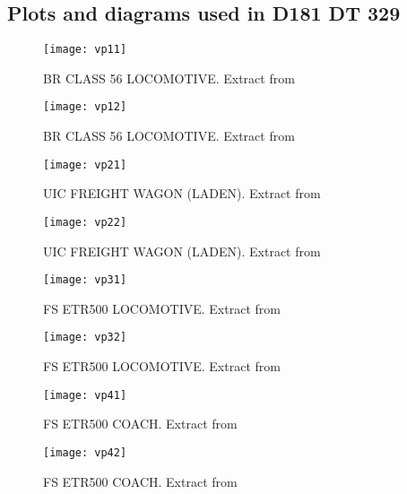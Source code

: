 \begin{appendices}


\chapter{Plots and diagrams used in D181 DT 329}\label{app:dt329data}

\begin{figure}[h]
    \centering
    \texttt{[image: vp11]}
    \caption{BR CLASS 56 LOCOMOTIVE. Extract from \citet[Appendix 2]{d181dt329}}
\end{figure}

\begin{figure}[h]
    \centering
    \texttt{[image: vp12]}
    \caption{BR CLASS 56 LOCOMOTIVE. Extract from \citet[Appendix 2]{d181dt329}}
\end{figure}

\begin{figure}[h]
    \centering
    \texttt{[image: vp21]}
    \caption{UIC FREIGHT WAGON (LADEN). Extract from \citet[Appendix 2]{d181dt329}}
\end{figure}

\begin{figure}[h]
    \centering
    \texttt{[image: vp22]}
    \caption{UIC FREIGHT WAGON (LADEN). Extract from \citet[Appendix 2]{d181dt329}}
\end{figure}

\begin{figure}[h]
    \centering
    \texttt{[image: vp31]}
    \caption{FS ETR500 LOCOMOTIVE. Extract from \citet[Appendix 2]{d181dt329}}
\end{figure}

\begin{figure}[h]
    \centering
    \texttt{[image: vp32]}
    \caption{FS ETR500 LOCOMOTIVE. Extract from \citet[Appendix 2]{d181dt329}}
\end{figure}

\begin{figure}[h]
    \centering
    \texttt{[image: vp41]}
    \caption{FS ETR500 COACH. Extract from \citet[Appendix 2]{d181dt329}}
\end{figure}

\begin{figure}[h]
    \centering
    \texttt{[image: vp42]}
    \caption{FS ETR500 COACH. Extract from \citet[Appendix 2]{d181dt329}}
\end{figure}


\end{appendices}
